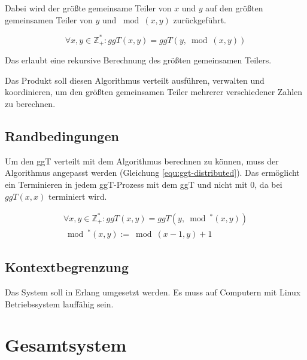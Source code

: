 \documentclass{article}
\begin{document}
Dabei wird der größte gemeinsame Teiler von $x$ und $y$ auf den größten gemeinsamen Teiler von $y$ und $\bmod{(x,y)}$
zurückgeführt.

\begin{equation}
\forall x,y \in \mathbb{Z}^{*}_{+}: ggT(x,y) = ggT(y,\bmod{(x,y)})
\label{equ:ggt-simple}
\end{equation}

Das erlaubt eine rekursive Berechnung des größten gemeinsamen Teilers.

Das Produkt soll diesen Algorithmus verteilt ausführen, verwalten und koordinieren, um den größten gemeinsamen Teiler
mehrerer verschiedener Zahlen zu berechnen.

\subsection{Randbedingungen}
Um den ggT verteilt mit dem Algorithmus berechnen zu können, muss der Algorithmus angepasst werden
(Gleichung \ref{equ:ggt-distributed}). Das ermöglicht ein Terminieren in jedem ggT-Prozess mit dem ggT und nicht mit 0,
da bei $ggT(x,x)$ terminiert wird.

\begin{multline}
\forall x,y \in \mathbb{Z}^{*}_{+}: ggT(x,y) = ggT(y,\bmod{^{*}(x,y)})\\
\bmod{^{*}(x,y)} := \bmod{(x-1, y)} + 1
\label{equ:ggt-distributed}
\end{multline}

\subsection{Kontextbegrenzung}
Das System soll in Erlang umgesetzt werden. Es muss auf Computern mit Linux Betriebssystem lauffähig sein.

\newpage

\section{Gesamtsystem}
\end{document}
